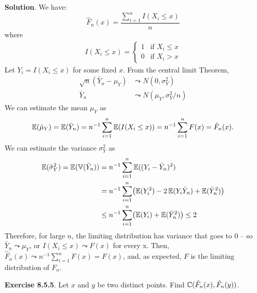 \textbf{Solution}.
We have:
\[
\hat{F}_{n}(x) = \frac{\sum_{i=1}^{n} I\left(X_{i} \leq x \right)}{n}
\]
where
\begin{align*}I\left(X_{i} \leq x\right) =
    \begin{cases}
      1   & \text{if } X_{i} \leq x \\
      0   & \text{if } X_{i} > x
    \end{cases}       
\end{align*}
Let \(Y_{i} = I\left(X_{i} \leq x \right)\) for some fixed \(x\). From the
central limit Theorem,
\begin{align*}
\sqrt{n} (\bar{Y}_{n} - \mu_Y) & \leadsto N(0, \sigma_Y^{2}) \\
\bar{Y}_{n} & \leadsto N(\mu_Y, \sigma_Y^{2} / n)
\end{align*}
We can estimate the mean \(\mu_Y\) as
\[
\operatorname{\mathbb{E}}(\hat{\mu}_{Y}) = \operatorname{\mathbb{E}}(\bar{Y}_{n}) = n^{-1} \sum_{i=1}^{n} \operatorname{\mathbb{E}}(I(X_{i} \leq x)) = n^{-1} \sum_{i=1}^{n} F(x) = \hat{F}_{n}(x).
\]
We can estimate the variance \(\sigma_Y^{2}\) as
\begin{align*}
\EXP(\hat{\sigma}_{Y}^{2}) 
  = \EXP(\VAR(\bar{Y}_{n})) 
& = n^{-1} \sum_{i=1}^{n} \EXP((Y_{i} - \bar{Y}_{n})^{2}) 
\\
& = n^{-1} \sum_{i=1}^{n} \left( \EXP(Y_{i}^{2}) - 2 \EXP(Y_{i} \bar{Y}_{n}) + \EXP(\bar{Y}_{n}^{2}) \right) 
\\
& \leq n^{-1} \sum_{i=1}^{n} \left( \EXP(Y_{i}) + \EXP(\bar{Y}_{n}^{2}) \right) \leq 2
\end{align*}
Therefore, for large \(n\), the limiting distribution has variance that
goes to 0 -- so \(\bar{Y}_{n} \leadsto \mu_Y\), or
\(I\left(X_{i} \leq x \right) \leadsto F(x)\) for every x. Then,
\(\hat{F}_{n}(x) \leadsto n^{-1} \sum_{i=1}^{n} F(x) = F(x)\),
and, as expected, \(F\) is the limiting distribution of \(F_n\).

\textbf{Exercise 8.5.5}. Let \(x\) and \(y\) be two distinct points.
Find \(\operatorname{\mathbb{C}}(\hat{F}_{n}(x), \hat{F}_{n}(y))\).

